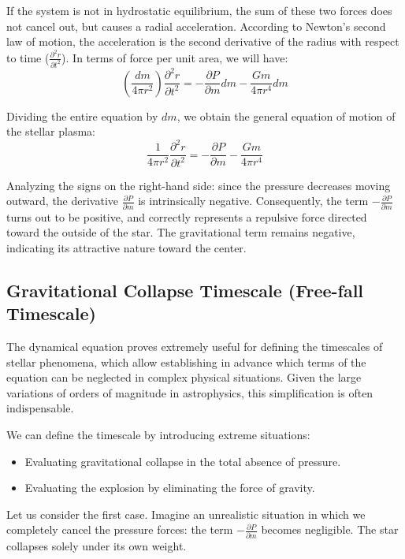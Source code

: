 If the system is not in hydrostatic equilibrium, the sum of these two forces does not cancel out, but causes a radial acceleration. According to Newton's second law of motion, the acceleration is the second derivative of the radius with respect to time ($\frac{\partial^2 r}{\partial t^2}$).
In terms of force per unit area, we will have:
\begin{equation}
\left(\frac{dm}{4\pi r^2}\right) \frac{\partial^2 r}{\partial t^2} = - \frac{\partial P}{\partial m} dm - \frac{G m}{4\pi r^4} dm
\end{equation}

Dividing the entire equation by $dm$, we obtain the general equation of motion of the stellar plasma:
\begin{equation}
\frac{1}{4\pi r^2} \frac{\partial^2 r}{\partial t^2} = - \frac{\partial P}{\partial m} - \frac{G m}{4\pi r^4}
\end{equation}

Analyzing the signs on the right-hand side: since the pressure decreases moving outward, the derivative $\frac{\partial P}{\partial m}$ is intrinsically negative. Consequently, the term $-\frac{\partial P}{\partial m}$ turns out to be positive, and correctly represents a repulsive force directed toward the outside of the star. The gravitational term remains negative, indicating its attractive nature toward the center.

\subsection{Gravitational Collapse Timescale (Free-fall Timescale)}

The dynamical equation proves extremely useful for defining the timescales of stellar phenomena, which allow establishing in advance which terms of the equation can be neglected in complex physical situations. Given the large variations of orders of magnitude in astrophysics, this simplification is often indispensable.

We can define the timescale by introducing extreme situations:
\begin{itemize}
\item Evaluating gravitational collapse in the total absence of pressure.
\item Evaluating the explosion by eliminating the force of gravity.
\end{itemize}

Let us consider the first case. Imagine an unrealistic situation in which we completely cancel the pressure forces: the term $-\frac{\partial P}{\partial m}$ becomes negligible. The star collapses solely under its own weight.

